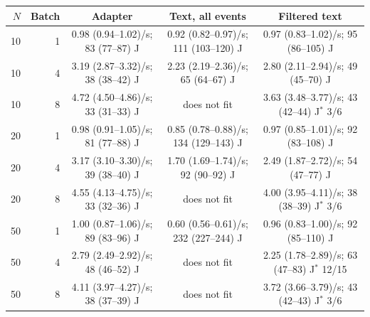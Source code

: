 \begin{tabular}{rrccc}
\toprule
$N$ & Batch & Adapter & Text, all events & Filtered text \\
\midrule
10 & 1 & 0.98 (0.94--1.02)/s; 83 (77--87) J & 0.92 (0.82--0.97)/s; 111 (103--120) J & 0.97 (0.83--1.02)/s; 95 (86--105) J \\
10 & 4 & 3.19 (2.87--3.32)/s; 38 (38--42) J & 2.23 (2.19--2.36)/s; 65 (64--67) J & 2.80 (2.11--2.94)/s; 49 (45--70) J \\
10 & 8 & 4.72 (4.50--4.86)/s; 33 (31--33) J & does not fit & 3.63 (3.48--3.77)/s; 43 (42--44) J$^\ast$ 3/6 \\
20 & 1 & 0.98 (0.91--1.05)/s; 81 (77--88) J & 0.85 (0.78--0.88)/s; 134 (129--143) J & 0.97 (0.85--1.01)/s; 92 (83--108) J \\
20 & 4 & 3.17 (3.10--3.30)/s; 39 (38--40) J & 1.70 (1.69--1.74)/s; 92 (90--92) J & 2.49 (1.87--2.72)/s; 54 (47--77) J \\
20 & 8 & 4.55 (4.13--4.75)/s; 33 (32--36) J & does not fit & 4.00 (3.95--4.11)/s; 38 (38--39) J$^\ast$ 3/6 \\
50 & 1 & 1.00 (0.87--1.06)/s; 89 (83--96) J & 0.60 (0.56--0.61)/s; 232 (227--244) J & 0.96 (0.83--1.00)/s; 92 (85--110) J \\
50 & 4 & 2.79 (2.49--2.92)/s; 48 (46--52) J & does not fit & 2.25 (1.78--2.89)/s; 63 (47--83) J$^\ast$ 12/15 \\
50 & 8 & 4.11 (3.97--4.27)/s; 38 (37--39) J & does not fit & 3.72 (3.66--3.79)/s; 43 (42--43) J$^\ast$ 3/6 \\
\bottomrule
\end{tabular}
